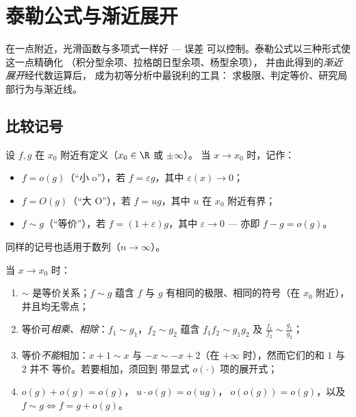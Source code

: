 \chapter{泰勒公式与渐近展开}\label{ch:b1:taylor}

在一点附近，光滑函数与多项式一样好 --- 误差
可以控制。泰勒公式以三种形式使这一点精确化
（积分型余项、拉格朗日型余项、杨型余项），
并由此得到的\emph{渐近展开}经代数运算后，
成为初等分析中最锐利的工具：
求极限、判定等价、研究局部行为与渐近线。

\section{比较记号}

\begin{definition}[兰道记号]\label{def:b1:taylor:landau}
设 $f, g$ 在 $x_0$ 附近有定义（$x_0 \in \R$ 或 $\pm\infty$）。
当 $x \to x_0$ 时，记作：
\begin{itemize}
  \item $f = o(g)$（“小 o”），若 $f = \varepsilon g$，其中
        $\varepsilon(x) \to 0$；
  \item $f = O(g)$（“大 O”），若 $f = u g$，其中
        $u$ 在 $x_0$ 附近有界；
  \item $f \sim g$（“等价”），若
        $f = (1 + \varepsilon) g$，其中 $\varepsilon \to 0$ ---
        亦即 $f - g = o(g)$。
\end{itemize}
同样的记号也适用于数列（$n \to \infty$）。
\end{definition}

\begin{proposition}[运算法则]\label{prop:b1:taylor:landaurules}
当 $x \to x_0$ 时：
\begin{enumerate}
  \item $\sim$ 是等价关系；$f \sim g$ 蕴含
        $f$ 与 $g$ 有相同的极限、相同的符号（在 $x_0$ 附近），
        并且均无零点；
  \item 等价可\emph{相乘、相除}：$f_1 \sim g_1$，$f_2
        \sim g_2$ 蕴含 $f_1 f_2 \sim g_1 g_2$ 及 $\frac{f_1}{f_2}
        \sim \frac{g_1}{g_2}$；
  \item 等价\emph{不能}相加：$x + 1 \sim x$ 与 $-x \sim
        -x + 2$（在 $+\infty$ 时），然而它们的和 $1$ 与 $2$ 并不
        等价。若要相加，须回到
        带显式 $o(\cdot)$ 项的展开式；
  \item $o(g) + o(g) = o(g)$，$\;u \cdot o(g) = o(ug)$，$\;o(o(g)) =
        o(g)$，以及 $f \sim g \iff f = g + o(g)$。
\end{enumerate}
\end{proposition}

